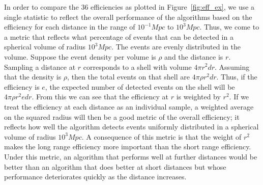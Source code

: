 \documentclass[twocolumn]{aastex62}
\begin{document}
In order to compare the 36 efficiencies as plotted in Figure~\ref{fig:eff_ex}, we use a single statistic to reflect the overall performance of the algorithms based on the efficiency for each distance in the range of $10^{-1} Mpc$ to $10^3 Mpc$. Thus, we come to a metric that reflects what percentage of events that can be detected in a spherical volume of radius $10^3 Mpc$. The events are evenly distributed in the volume. Suppose the event density per volume is $\rho$ and the distance is $r$. Sampling a distance at $r$ corresponds to a shell with volume $4 \pi r^2 dr$. Assuming that the density is $\rho$, then the total events on that shell are $4 \pi \rho r^2 dr$. Thus, if the efficiency is $e$, the expected number of detected events on the shell will be $4 \pi \rho r^2 e dr$. From this we can see that the efficiency at $r$ is weighted by $r^2$. If we treat the efficiency at each distance as an individual sample, a weighted average on the squared radius will then be a good metric of the overall efficiency; it reflects how well the algorithm detects events uniformly distributed in a spherical volume of radius $10^3 Mpc$. A consequence of this metric is that the weight of $r^2$ makes the long range efficiency more important than the short range efficiency. Under this metric, an algorithm that performs well at further distances would be better than an algorithm that does better at short distances but whose performance deteriorates quickly as the distance increases. 
\end{document}
